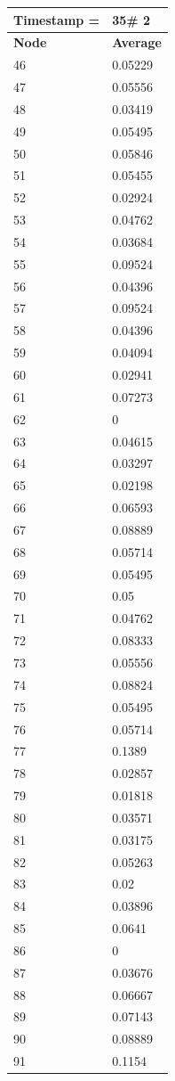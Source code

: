 \begin{tabular}{|l||l|}
\hline
\textbf{Timestamp =} & \textbf{35}\# 2\\\hline
	\textbf{Node} & \textbf{Average} \\ \hline
\hline
	46 & 0.05229 \\ \hline
	47 & 0.05556 \\ \hline
	48 & 0.03419 \\ \hline
	49 & 0.05495 \\ \hline
	50 & 0.05846 \\ \hline
	51 & 0.05455 \\ \hline
	52 & 0.02924 \\ \hline
	53 & 0.04762 \\ \hline
	54 & 0.03684 \\ \hline
	55 & 0.09524 \\ \hline
	56 & 0.04396 \\ \hline
	57 & 0.09524 \\ \hline
	58 & 0.04396 \\ \hline
	59 & 0.04094 \\ \hline
	60 & 0.02941 \\ \hline
	61 & 0.07273 \\ \hline
	62 & 0 \\ \hline
	63 & 0.04615 \\ \hline
	64 & 0.03297 \\ \hline
	65 & 0.02198 \\ \hline
	66 & 0.06593 \\ \hline
	67 & 0.08889 \\ \hline
	68 & 0.05714 \\ \hline
	69 & 0.05495 \\ \hline
	70 & 0.05 \\ \hline
	71 & 0.04762 \\ \hline
	72 & 0.08333 \\ \hline
	73 & 0.05556 \\ \hline
	74 & 0.08824 \\ \hline
	75 & 0.05495 \\ \hline
	76 & 0.05714 \\ \hline
	77 & 0.1389 \\ \hline
	78 & 0.02857 \\ \hline
	79 & 0.01818 \\ \hline
	80 & 0.03571 \\ \hline
	81 & 0.03175 \\ \hline
	82 & 0.05263 \\ \hline
	83 & 0.02 \\ \hline
	84 & 0.03896 \\ \hline
	85 & 0.0641 \\ \hline
	86 & 0 \\ \hline
	87 & 0.03676 \\ \hline
	88 & 0.06667 \\ \hline
	89 & 0.07143 \\ \hline
	90 & 0.08889 \\ \hline
	91 & 0.1154 \\ \hline
\end{tabular}
